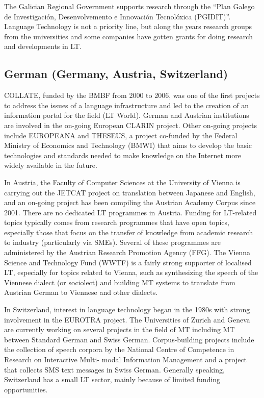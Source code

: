 \documentclass[10pt, plain]{../../metanetpaper}
\begin{document}
\begin{multicols}{2}
The Galician Regional Government supports research through the “Plan Galego de Investigación, Desenvolvemento e Innovación Tecnolóxica (PGIDIT)”. Language Technology is not a priority line, but along the years research groups from the universities and some companies have gotten grants for doing research and developments in LT.

\subsection*{German (Germany, Austria, Switzerland)}
\label{sec:germ-germ-austr}

COLLATE, funded by the BMBF from 2000 to 2006, was one of the first projects to address the issues of a language infrastructure and led to the creation of an information portal for the field (LT World). German and Austrian institutions are involved in the on-going European CLARIN project. Other on-going projects include EUROPEANA and THESEUS, a project co-funded by the Federal Ministry of Economics and Technology (BMWI) that aims to develop the basic technologies and standards needed to make knowledge on the Internet more widely available in the future.

In Austria, the Faculty of Computer Sciences at the University of Vienna is carrying out the JETCAT project on translation between Japanese and English, and an on-going project has been compiling the Austrian Academy Corpus since 2001. There are no dedicated LT programmes in Austria. Funding for LT-related topics typically comes from research programmes that have open topics, especially those that focus on the transfer of knowledge from academic research to industry (particularly via SMEs). Several of these programmes are administered by the Austrian Research Promotion Agency (FFG). The Vienna Science and Technology Fund (WWTF) is a fairly strong supporter of localised LT, especially for topics related to Vienna, such as synthesizing the speech of the Viennese dialect (or sociolect) and building MT systems to translate from Austrian German to Viennese and other dialects.

In Switzerland, interest in language technology began in the 1980s with strong involvement in the EUROTRA project. The Universities of Zurich and Geneva are currently working on several projects in the field of MT including MT between Standard German and Swiss German. Corpus-building projects include the collection of speech corpora by the National Centre of Competence in Research on Interactive Multi- modal Information Management and a project that collects SMS text messages in Swiss German. Generally speaking, Switzerland has a small LT sector, mainly because of limited funding opportunities. 


\end{multicols}
\end{document}
